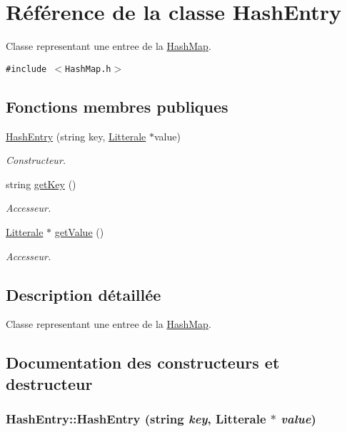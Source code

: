 \hypertarget{class_hash_entry}{
\section{Référence de la classe HashEntry}
\label{class_hash_entry}
}
Classe representant une entree de la \hyperlink{class_hash_map}{HashMap}.  


{\tt \#include $<$HashMap.h$>$}

\subsection*{Fonctions membres publiques}
\begin{CompactItemize}
\item 
\hyperlink{class_hash_entry_14144ea0077dd77f83ec2be03c019033}{HashEntry} (string key, \hyperlink{class_litterale}{Litterale} $\ast$value)
\begin{CompactList}\small\item\em Constructeur. \item\end{CompactList}\item 
string \hyperlink{class_hash_entry_040b7d2f3147a6944ad8d66301bdf80d}{getKey} ()
\begin{CompactList}\small\item\em Accesseur. \item\end{CompactList}\item 
\hyperlink{class_litterale}{Litterale} $\ast$ \hyperlink{class_hash_entry_0edc1c3f8c73882a6d8a9fec88c45f6b}{getValue} ()
\begin{CompactList}\small\item\em Accesseur. \item\end{CompactList}\end{CompactItemize}


\subsection{Description détaillée}
Classe representant une entree de la \hyperlink{class_hash_map}{HashMap}. 

\subsection{Documentation des constructeurs et destructeur}
\hypertarget{class_hash_entry_14144ea0077dd77f83ec2be03c019033}{
\subsubsection[{HashEntry}]{\setlength{\rightskip}{0pt plus 5cm}HashEntry::HashEntry (string {\em key}, \/  {\bf Litterale} $\ast$ {\em value})}}
\label{class_hash_entry_14144ea0077dd77f83ec2be03c019033}


